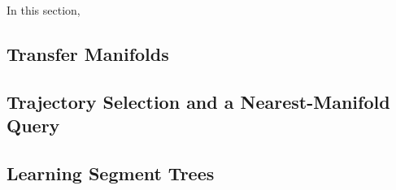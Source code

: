 In this section, 
\subsection{Transfer Manifolds}
\subsection{Trajectory Selection and a Nearest-Manifold Query}
\subsection{Learning Segment Trees}
